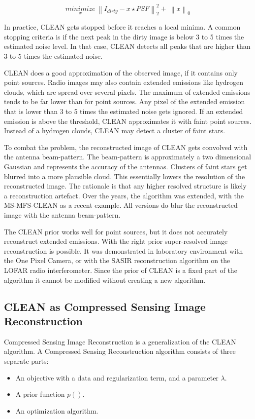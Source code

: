 \begin{equation}\label{intro:eq:clean}
\underset{x}{minimize} \: \left \| I_{dirty} - x \star PSF \right \|_2^2 + \: \left \| x \right \|_0
\end{equation}

In practice, CLEAN gets stopped before it reaches a local minima. A common stopping criteria is if the next peak in the dirty image is below 3 to 5 times the estimated noise level. In that case, CLEAN detects all peaks that are higher than 3 to 5 times the estimated noise. 

CLEAN does a good approximation of the observed image, if it contains only point sources. Radio images may also contain extended emissions like hydrogen clouds, which are spread over several pixels. The maximum of extended emissions tends to be far lower than for point sources. Any pixel of the extended emission that is lower than 3 to 5 times the estimated noise gets ignored. If an extended emission is above the threshold, CLEAN approximates it with faint point sources. Instead of a hydrogen clouds, CLEAN may detect a cluster of faint stars.

To combat the problem, the reconstructed image of CLEAN gets convolved with the antenna beam-pattern. The beam-pattern is approximately a two dimensional Gaussian and represents the accuracy of the antennas. Clusters of faint stars get blurred into a more plausible cloud. This essentially lowers the resolution of the reconstructed image. The rationale is that any higher resolved structure is likely a reconstruction artefact. Over the years, the algorithm was extended, with the MS-MFS-CLEAN\cite{rau2011multi} as a recent example. All versions do blur the reconstructed image with the antenna beam-pattern.

The CLEAN prior works well for point sources, but it does not accurately reconstruct extended emissions. With the right prior super-resolved image reconstruction is possible. It was demonstrated in laboratory environment with the One Pixel Camera\cite{singlePixel}, or with the SASIR\cite{girard2015sparse} reconstruction algorithm on the LOFAR radio interferometer. Since the prior of CLEAN is a fixed part of the algorithm it cannot be modified without creating a new algorithm.


\subsection{CLEAN as Compressed Sensing Image Reconstruction}
Compressed Sensing Image Reconstruction is a generalization of the CLEAN algorithm. A Compressed Sensing Reconstruction algorithm consists of three separate parts:
\begin{itemize}
	\item An objective with a data and regularization term, and a parameter $\lambda$.
	\item A prior function $p()$.
	\item An optimization algorithm.
\end{itemize}

